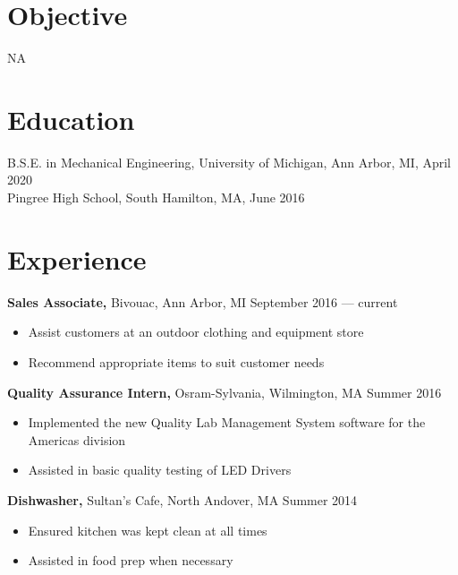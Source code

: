 \documentclass[margin]{res}
\begin{document}
 
 
 
\address{{\bf Present Address} \\ 1503 Washington Heights \\ 3418 Butler House, Mary Markley Hall \\ Ann Arbor, MI 48109  \\ (978) 873-7207 }
\address{{\bf Permanent Address} \\ 1499 Salem Street \\ North Andover, MA 01845 \\ (978) 725-4887 }

 
\begin{resume} 
	 
	\section{Objective} 
	NA
	
	\section{Education} 
	B.S.E. in Mechanical Engineering, University of Michigan, Ann Arbor, MI, April 2020 \\
	Pingree High School, South Hamilton, MA, June 2016
	 
	
	\section{Experience}
	{\bf Sales Associate,} Bivouac, Ann Arbor, MI \hfill September 2016 --- current
	\begin{itemize} \itemsep -2pt
		\item Assist customers at an outdoor clothing and equipment store
		\item Recommend appropriate items to suit customer needs
	\end{itemize}
	 
	{\bf Quality Assurance Intern,} Osram-Sylvania, Wilmington, MA \hfill Summer 2016
	\begin{itemize} \itemsep -2pt
		\item Implemented the new Quality Lab Management System software for the Americas division
		\item Assisted in basic quality testing of LED Drivers 
	\end{itemize}
	
	{\bf Dishwasher,} Sultan's Cafe, North Andover, MA \hfill Summer 2014
	\begin{itemize} \itemsep -2pt
		\item Ensured kitchen was kept clean at all times
		\item Assisted in food prep when necessary
	\end{itemize}
	

\end{resume}
\end{document}
